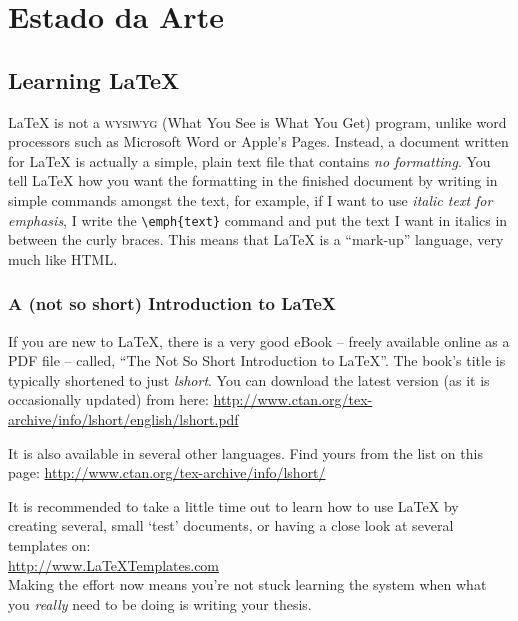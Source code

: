 
\chapter{Estado da Arte} %

\label{chap:Chapter2} %


\section{Learning \LaTeX{}}

\LaTeX{} is not a \textsc{wysiwyg} (What You See is What You Get) program, unlike word processors such as Microsoft Word or Apple's Pages. Instead, a document written for \LaTeX{} is actually a simple, plain text file that contains \emph{no formatting}. You tell \LaTeX{} how you want the formatting in the finished document by writing in simple commands amongst the text, for example, if I want to use \emph{italic text for emphasis}, I write the \verb|\emph{text}| command and put the text I want in italics in between the curly braces. This means that \LaTeX{} is a \enquote{mark-up} language, very much like HTML.

\subsection{A (not so short) Introduction to \LaTeX{}}

If you are new to \LaTeX{}, there is a very good eBook -- freely available online as a PDF file -- called, \enquote{The Not So Short Introduction to \LaTeX{}}. The book's title is typically shortened to just \emph{lshort}. You can download the latest version (as it is occasionally updated) from here:
\url{http://www.ctan.org/tex-archive/info/lshort/english/lshort.pdf}

It is also available in several other languages. Find yours from the list on this page: \url{http://www.ctan.org/tex-archive/info/lshort/}

It is recommended to take a little time out to learn how to use \LaTeX{} by creating several, small `test' documents, or having a close look at several templates on:\\ 
\url{http://www.LaTeXTemplates.com}\\ 
Making the effort now means you're not stuck learning the system when what you \emph{really} need to be doing is writing your thesis.

